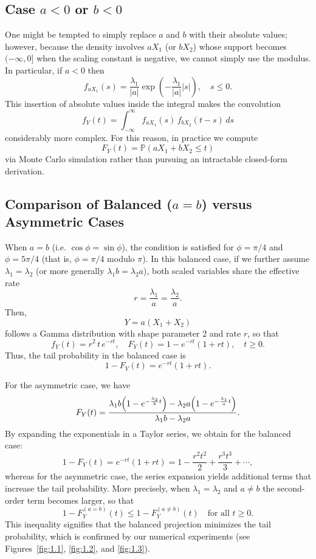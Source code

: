 \subsection{Case \(a<0\) or \(b<0\)}
One might be tempted to simply replace \(a\) and \(b\) with their absolute values; however, because the density involves \(aX_1\) (or \(bX_2\)) whose support becomes \((-\infty,0]\) when the scaling constant is negative, we cannot simply use the modulus. In particular, if \(a<0\) then
\[
f_{aX_1}(s)=\frac{\lambda_1}{|a|}\exp\left(-\frac{\lambda_1}{|a|}|s|\right),\quad s\le0.
\]
This insertion of absolute values inside the integral makes the convolution
\[
f_Y(t)=\int_{-\infty}^{\infty} f_{aX_1}(s)\,f_{bX_2}(t-s)\,ds
\]
considerably more complex. For this reason, in practice we compute
\[
F_Y(t)=\mathbb{P}(aX_1+bX_2\le t)
\]
via Monte Carlo simulation rather than pursuing an intractable closed-form derivation.

\subsection{Comparison of Balanced (\(a=b\)) versus Asymmetric Cases}
When \(a=b\) (i.e. \(\cos\phi=\sin\phi\)), the condition is satisfied for \(\phi=\pi/4\) and \(\phi=5\pi/4\) (that is, \(\phi=\pi/4\) modulo \(\pi\)). In this balanced case, if we further assume \(\lambda_1=\lambda_2\) (or more generally \(\lambda_1b=\lambda_2a\)), both scaled variables share the effective rate
\[
r=\frac{\lambda_1}{a}=\frac{\lambda_2}{a}.
\]
Then,
\[
Y=a(X_1+X_2)
\]
follows a Gamma distribution with shape parameter 2 and rate \(r\), so that
\[
f_Y(t)=r^2\,t\,e^{-rt},\quad F_Y(t)=1-e^{-rt}(1+rt),\quad t\ge0.
\]
Thus, the tail probability in the balanced case is
\[
1-F_Y(t)=e^{-rt}(1+rt).
\]

For the asymmetric case, we have
\[
F_Y(t)=\frac{\lambda_1b\Bigl(1-e^{-\frac{\lambda_2}{b}t}\Bigr)-\lambda_2a\Bigl(1-e^{-\frac{\lambda_1}{a}t}\Bigr)}{\lambda_1b-\lambda_2a}.
\]
By expanding the exponentials in a Taylor series, we obtain for the balanced case:
\[
1-F_Y(t)=e^{-rt}(1+rt)=1-\frac{r^2t^2}{2}+\frac{r^3t^3}{3}+\cdots,
\]
whereas for the asymmetric case, the series expansion yields additional terms that increase the tail probability. More precisely, when \(\lambda_1=\lambda_2\) and \(a\neq b\) the second-order term becomes larger, so that
\[
1-F_Y^{(a=b)}(t) \le 1-F_Y^{(a\neq b)}(t) \quad \text{for all } t\ge0.
\]
This inequality signifies that the balanced projection minimizes the tail probability, which is confirmed by our numerical experiments (see Figures~\ref{fig:1.1}, \ref{fig:1.2}, and \ref{fig:1.3}).

